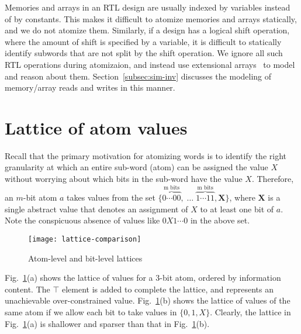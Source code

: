\documentclass{llncs}
\begin{document}
Memories and arrays in an RTL design are usually indexed by variables
instead of by constants.  This makes it difficult to atomize memories
and arrays statically, and we do not atomize them.  Similarly, if a
design has a logical shift operation, where the amount of shift is
specified by a variable, it is difficult to statically identify
subwords that are not split by the shift operation.  We ignore all
such RTL operations during atomizaion, and instead use extensional
arrays~\cite{StumpBarrettDill01} to model and reason about them.
Section~\ref{subsec:sim-inv} discusses the modeling of
memory/array reads and writes in this manner.  


\section{Lattice of atom values}\label{sec:lattice}

Recall that the primary motivation for atomizing words is to identify
the right granularity at which an entire sub-word (atom) can be
assigned the value $X$ without worrying about which bits in the
sub-word have the value $X$.  Therefore, an $m$-bit atom $a$ takes
values from the set $\{\overbrace{0\cdots 00}^\text{m bits}, \;\ldots\;
\overbrace{1\cdots 11}^\text{m bits}, \mathbf{X}\}$, where
$\mathbf{X}$ is a single abstract value that denotes an assignment of
$X$ to at least one bit of $a$.
Note the conspicuous absence of values like $0X1\cdots 0$ in the above
set.
\begin{figure}[htbp]
\begin{center}
\hspace{-0.25in}\texttt{[image: lattice-comparison]}
\caption{\label{lattice-comparison} Atom-level and bit-level lattices}
\end{center}
\end{figure}
Fig.~\ref{lattice-comparison}(a) shows the lattice of values for a
$3$-bit atom, ordered by information content.  The $\top$ element is
added to complete the lattice, and represents an unachievable
over-constrained value.  Fig.~\ref{lattice-comparison}(b) shows the
lattice of values of the same atom if we allow each bit to take values
in $\{0, 1, X\}$.  Clearly, the lattice in
Fig.~\ref{lattice-comparison}(a) is shallower and sparser than that
in Fig.~\ref{lattice-comparison}(b).
\end{document}

